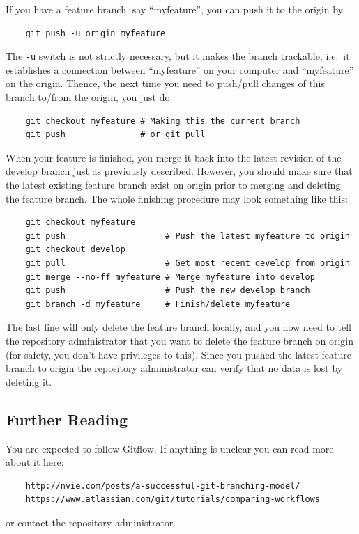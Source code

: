 \documentclass[10pt,a4paper]{article}
\begin{document}
If you have a feature branch, say ``myfeature'', you can push it to the origin by

\begin{verbatim}
	git push -u origin myfeature
\end{verbatim}
The \verb$-u$ switch is not strictly necessary, but it makes the branch trackable, i.e.\ it establishes a connection between ``myfeature'' on your computer and ``myfeature'' on the origin. Thence, the next time you need to push/pull changes of this branch to/from the origin, you just do:

\begin{verbatim}
	git checkout myfeature # Making this the current branch
	git push               # or git pull
\end{verbatim}
When your feature is finished, you merge it back into the latest revision of the develop branch just as previously described. However, you should make sure that the latest existing feature branch exist on origin prior to merging and deleting the feature branch. The whole finishing procedure may look something like this:

\begin{verbatim}
	git checkout myfeature
	git push                    # Push the latest myfeature to origin
	git checkout develop
	git pull                    # Get most recent develop from origin
	git merge --no-ff myfeature # Merge myfeature into develop
	git push                    # Push the new develop branch
	git branch -d myfeature     # Finish/delete myfeature
\end{verbatim}
The last line will only delete the feature branch locally, and you now need to tell the repository administrator that you want to delete the feature branch on origin (for safety, you don't have privileges to this). Since you pushed the latest feature branch to origin the repository administrator can verify that no data is lost by deleting it.

\subsection{Further Reading}
You are expected to follow Gitflow. If anything is unclear you can read more about it here:
\begin{verbatim}
	http://nvie.com/posts/a-successful-git-branching-model/
	https://www.atlassian.com/git/tutorials/comparing-workflows
\end{verbatim}
or contact the repository administrator.
\end{document}
